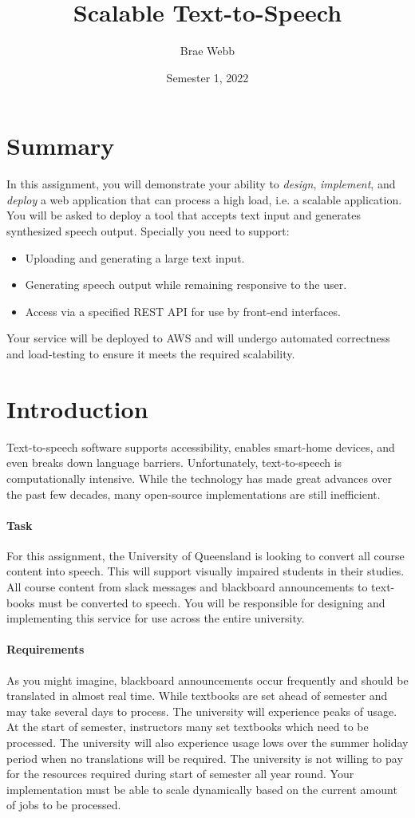 \documentclass{csse4400}
\title{Scalable Text-to-Speech}
\author{Brae Webb}
\date{Semester 1, 2022}
\begin{document}
\maketitle

\section*{Summary}
In this assignment, you will demonstrate your ability to \textsl{design},
\textsl{implement}, and \textsl{deploy} a web application that can process a high load,
i.e. a scalable application.
You will be asked to deploy a tool that accepts text input and generates synthesized speech output.
Specially you need to support:
\begin{itemize}
    \item Uploading and generating a large text input.
    \item Generating speech output while remaining responsive to the user.
    \item Access via a specified REST API for use by front-end interfaces.
\end{itemize}

Your service will be deployed to AWS and will undergo automated correctness and load-testing to ensure it meets the required scalability.

\section{Introduction}
Text-to-speech software supports accessibility,
enables smart-home devices,
and even breaks down language barriers.
Unfortunately, text-to-speech is computationally intensive.
While the technology has made great advances over the past few decades,
many open-source implementations are still inefficient.

\paragraph{Task}
For this assignment,
the University of Queensland is looking to convert all course content into speech.
This will support visually impaired students in their studies.
All course content from slack messages and blackboard announcements to text-books must be converted to speech.
You will be responsible for designing and implementing this service for use across the entire university.

\paragraph{Requirements}
As you might imagine,
blackboard announcements occur frequently and should be translated in almost real time.
While textbooks are set ahead of semester and may take several days to process.
The university will experience peaks of usage.
At the start of semester,
instructors many set textbooks which need to be processed.
The university will also experience usage lows over the summer holiday period when no translations will be required.
The university is not willing to pay for the resources required during start of semester all year round.
Your implementation must be able to scale dynamically based on the current amount of jobs to be processed.
\end{document}
